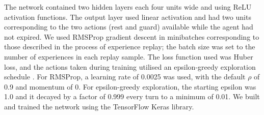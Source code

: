 The network contained two hidden layers each four units wide and using ReLU
activation functions. The output layer used linear activation and had two units
corresponding to the two actions (rest and guard) available while the agent had
not expired. We used RMSProp gradient descent in minibatches corresponding to
those described in the process of experience replay; the batch size was set to
the number of experiences in each replay sample. The loss function used was
Huber loss, and the actions taken during training utilised an epsilon-greedy
exploration schedule \cite{Mnih+15,HaaseltGS16}.
%
For RMSProp, a learning rate of 0.0025 was used, with the default $\rho$ of 0.9
and momentum of 0. For epsilon-greedy exploration, the starting epsilon was 1.0
and it decayed by a factor of 0.999 every turn to a minimum of 0.01. We built
and trained the network using the TensorFlow Keras library.

